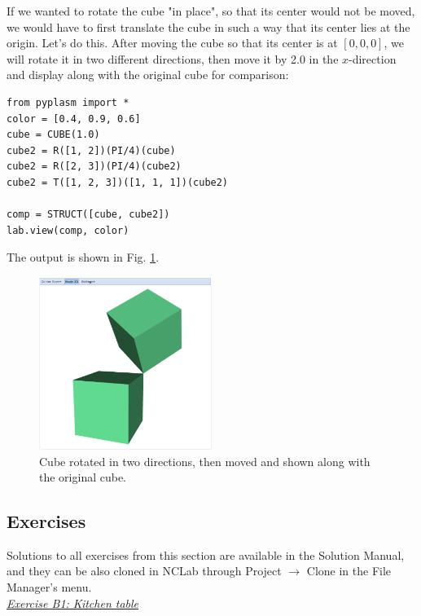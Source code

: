 \documentclass[article,A4,12pt]{llncs}
\begin{document}
If we wanted to 
rotate the cube "in place", so that its center would not be moved,
we would have to first translate the cube in such a way that its center
lies at the origin. Let's do this. After moving the cube so that 
its center is at $[0, 0, 0]$, we will rotate it in two different directions,
then move it by 2.0 in the $x$-direction and display along with 
the original cube for comparison:

\begin{verbatim}
from pyplasm import *
color = [0.4, 0.9, 0.6]
cube = CUBE(1.0)
cube2 = R([1, 2])(PI/4)(cube)
cube2 = R([2, 3])(PI/4)(cube2)
cube2 = T([1, 2, 3])([1, 1, 1])(cube2)

comp = STRUCT([cube, cube2])
lab.view(comp, color)
\end{verbatim}
The output is shown in Fig. \ref{fig:rot-2}.
\newpage

\begin{figure}[!ht]
\begin{center}
\includegraphics[width=0.5\textwidth]{img/rot-2.png}
\end{center}
\vspace{-2mm}
\caption{Cube rotated in two directions, then moved and shown along with the original cube.}
\label{fig:rot-2}
\end{figure}

\subsection{Exercises}

Solutions to all exercises from this section are available in the Solution Manual, and 
they can be also cloned in NCLab through Project $\rightarrow$ Clone in the 
File Manager's menu.\\

\noindent
\underline{\em Exercise B1: Kitchen table}
\end{document}
